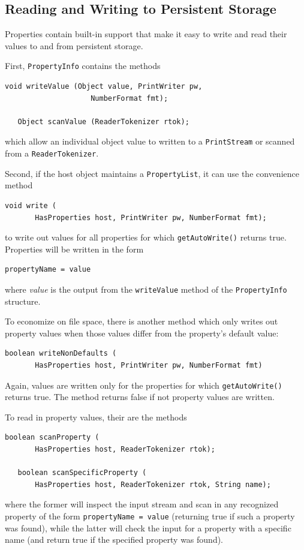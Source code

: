 \documentclass{article}
\begin{document}
\label{readWriteSec}
\subsection{Reading and Writing to Persistent Storage }

Properties contain built-in support that make it easy to write and
read their values to and from persistent storage. 

First, {\tt PropertyInfo} contains the methods
\begin{lstlisting}[]
   void writeValue (Object value, PrintWriter pw, 
                    NumberFormat fmt);

   Object scanValue (ReaderTokenizer rtok);
\end{lstlisting}
which allow an individual object value to written to
a {\tt PrintStream} or scanned from a {\tt ReaderTokenizer}.

Second, if the host object maintains a {\tt PropertyList},
it can use the convenience method 
\begin{lstlisting}[]
   void write (
       HasProperties host, PrintWriter pw, NumberFormat fmt);
\end{lstlisting}
to write out values for all properties for which 
{\tt getAutoWrite()} returns true. Properties will be written in
the form
\begin{lstlisting}[]
   propertyName = value  
\end{lstlisting}
where {\it value} is the output from the {\tt writeValue}
method of the {\tt PropertyInfo} structure.

To economize on file space, there is another method 
which only writes out property values when those 
values differ from the property's default value:
\begin{lstlisting}[]
   boolean writeNonDefaults (
       HasProperties host, PrintWriter pw, NumberFormat fmt)
\end{lstlisting}
Again, values are written only for the properties for which 
{\tt getAutoWrite()} returns true. The method returns false if not property
values are written.

To read in property values, their are the methods 
\begin{lstlisting}[]
   boolean scanProperty (
       HasProperties host, ReaderTokenizer rtok);

   boolean scanSpecificProperty (
       HasProperties host, ReaderTokenizer rtok, String name);
\end{lstlisting}
where the former will inspect the input stream and scan in any
recognized property of the form {\tt propertyName = value} (returning
true if such a property was found), while the latter will check the
input for a property with a specific name (and return true if the
specified property was found).
\end{document}
